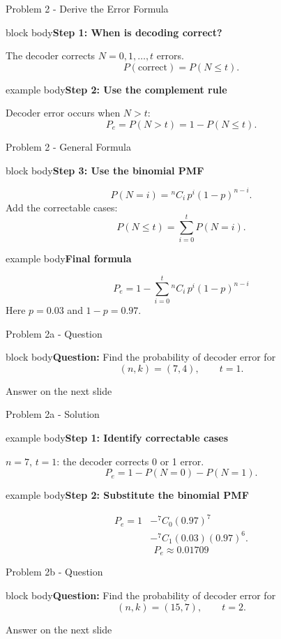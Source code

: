 \documentclass[aspectratio=169,11pt]{beamer}
\newcommand{\qbox}[1]{\begin{beamercolorbox}[rounded=true,wd=\linewidth,sep=0.75em]{block body}\color{darkText}\textbf{Question:} #1\end{beamercolorbox}}
\newenvironment{answerbox}[1]{\begin{beamercolorbox}[rounded=true,wd=\linewidth,sep=0.75em]{example body}\color{darkText}\textbf{#1}\par\medskip}{\end{beamercolorbox}}
\newenvironment{cleanblock}[1]{\begin{beamercolorbox}[rounded=true,wd=\linewidth,sep=0.75em]{block body}\color{darkText}\textbf{#1}\par\medskip}{\end{beamercolorbox}}
\newcommand{\nextanswer}{\vfill\centering\textcolor{mutedText}{\Large Answer on the next slide}}
\begin{document}
\begin{frame}{Problem 2 - Derive the Error Formula}
\small
\begin{cleanblock}{Step 1: When is decoding correct?}
The decoder corrects $N=0,1,\ldots,t$ errors.
\[
P(\text{correct})=P(N\le t).
\]
\end{cleanblock}
\begin{answerbox}{Step 2: Use the complement rule}
Decoder error occurs when $N>t$:
\[
P_e=P(N>t)=1-P(N\le t).
\]
\end{answerbox}
\end{frame}

\begin{frame}{Problem 2 - General Formula}
\footnotesize
\begin{cleanblock}{Step 3: Use the binomial PMF}
\[
P(N=i)={}^{n}C_i\,p^i(1-p)^{n-i}.
\]
Add the correctable cases:
\[
P(N\le t)=\sum_{i=0}^{t}P(N=i).
\]
\end{cleanblock}
\begin{answerbox}{Final formula}
\[
\boxed{P_e=1-\sum_{i=0}^{t}{}^nC_i\,p^i(1-p)^{n-i}}
\]
Here $p=0.03$ and $1-p=0.97$.
\end{answerbox}
\end{frame}

\begin{frame}{Problem 2a - Question}
\qbox{Find the probability of decoder error for
\[
(n,k)=(7,4),\qquad t=1.
\]}
\nextanswer
\end{frame}

\begin{frame}{Problem 2a - Solution}
\small
\begin{answerbox}{Step 1: Identify correctable cases}
$n=7$, $t=1$: the decoder corrects 0 or 1 error.
\[
P_e=1-P(N=0)-P(N=1).
\]
\end{answerbox}
\begin{answerbox}{Step 2: Substitute the binomial PMF}
\[
\begin{aligned}
P_e=1&-{}^7C_0(0.97)^7\\
     &-{}^7C_1(0.03)(0.97)^6.
\end{aligned}
\]
\[
\boxed{P_e\approx0.01709}
\]
\end{answerbox}
\end{frame}

\begin{frame}{Problem 2b - Question}
\qbox{Find the probability of decoder error for
\[
(n,k)=(15,7),\qquad t=2.
\]}
\nextanswer
\end{frame}
\end{document}
